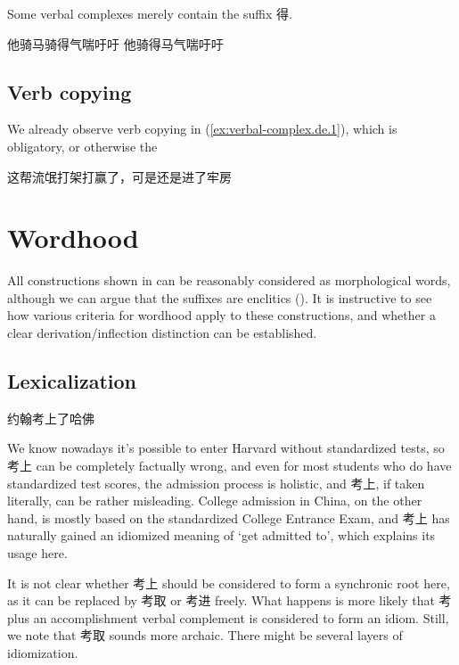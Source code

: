 \documentclass[UTF8, a4paper, oneside, scheme=plain, 12pt]{ctexrep}
\newcommand{\translate}[1]{`#1'}
\begin{document}
Some verbal complexes merely contain the suffix 得.


\begin{exe}
    \ex\label{ex:verbal-complex.de.1} 他骑马骑得气喘吁吁
    \ex 他骑得马气喘吁吁
\end{exe}

\subsection{Verb copying}

We already observe verb copying in (\ref{ex:verbal-complex.de.1}),
which is obligatory, or otherwise the 

\begin{exe}
    \ex 这帮流氓打架打赢了，可是还是进了牢房
\end{exe}

\section{Wordhood}\label{sec:verbal-complex.wordhood}

All constructions shown in 
can be reasonably considered as morphological words,
although we can argue that the suffixes are enclitics
().
It is instructive to see how various criteria for wordhood apply to these constructions,
and whether a clear derivation/inflection distinction can be established.

\subsection{Lexicalization}

\begin{exe}
    \ex 约翰考上了哈佛
\end{exe}

We know nowadays it's possible to enter Harvard without standardized tests,
so 考上 can be completely factually wrong,
and even for most students who do have standardized test scores,
the admission process is holistic, and 考上, if taken literally,
can be rather misleading.
College admission in China, on the other hand, is mostly based on the standardized College Entrance Exam,
and 考上 has naturally gained an idiomized meaning of \translate{get admitted to},
which explains its usage here.

It is not clear whether 考上 should be considered to form a synchronic root here,
as it can be replaced by 考取 or 考进 freely.
What happens is more likely that 考 plus an accomplishment verbal complement is considered to form an idiom.
Still, we note that 考取 sounds more archaic.
There might be several layers of idiomization.
\end{document}
